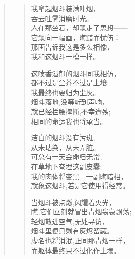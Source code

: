 \documentclass[openany,oneside]{book}
\theoremstyle{cthmstyle}
\theoremstyle{remark}
\begin{document}
\begin{quote}
    \begin{verse}
        我拿起烟斗装满叶烟，\\
        \hspace{1em}吞云吐雾消磨时光。\\
        人在那坐着，却飘走了思想------\\
        \hspace{1em}它飘向一幅画，晦黯而忧伤：\\
        \hspace{2em}那画告诉我这是多么相像，\\
        \hspace{2em}我和这烟斗一模一样。\\
        \vspace{1em}
        
        这喷香溢郁的烟斗同我相仿，\\
        \hspace{1em}都不过是尘芥不过是土壤;\\
        我最终也要归为尘灰。\\
        \hspace{1em}烟斗落地,没等听到声响，\\
        \hspace{2em}就已经拦腰摔断,不幸遭殃;\\
        \hspace{2em}相同的命运我也将承当。\par
        \vspace{1em}
        
        洁白的烟斗没有污斑,\\
        \hspace{1em}从未玷染，从未弄脏。\\
        可总有一天会命归无常, \\
        \hspace{1em}在草地下奄埋这副皮囊;\\
        \hspace{2em}我的肉体将变黑，一副晦暗相，\\
        \hspace{2em}就象这烟斗,若是它使用得经常。\\
        \vspace{1em}
        
        当烟斗被点燃,闪耀着火光，\\
        \hspace{1em}瞧,它们立刻就冒出青烟袅袅飘荡;\\
        轻烟散进空气,无处寻访，\\
        \hspace{1em}烟斗里便只剩有灰烬留藏。\\
        \hspace{2em}虚名也将消泯,正同那青烟一样，\\
        \hspace{2em}而躯体最终只不过化作上壤。\\
        \vspace{1em}
        

\end{verse}
\end{quote}
\end{document}
